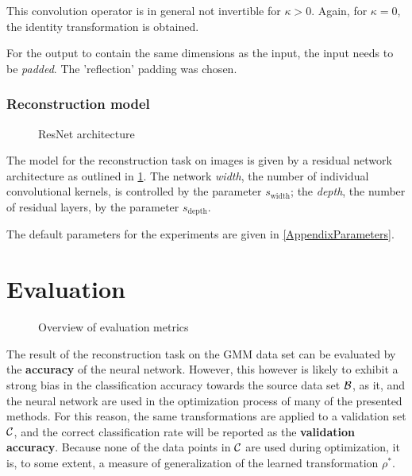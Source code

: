 This convolution operator is in general not invertible for $\kappa > 0$.
Again, for $\kappa = 0$, the identity transformation is obtained.

For the output to contain the same dimensions as the input, the input needs to be \textit{padded}.
The 'reflection' padding was chosen.


\subsubsection{Reconstruction model}

\begin{figure}[!ht]
\begin{minipage}{0.5\textwidth}
\centering

\end{minipage}
\begin{minipage}{0.5\textwidth}
\centering

\end{minipage}
\caption{ResNet architecture}
\label{fig:resnet}
\end{figure}

The model for the reconstruction task on images is given by a residual network architecture
as outlined in \cref{fig:resnet}. 
The network \textit{width}, the number of individual convolutional kernels, is controlled by the parameter $s_\text{width}$; the \textit{depth}, the number of residual layers, by the parameter
$s_\text{depth}$.

The default parameters for the experiments are given in \cref{AppendixParameters}.




\section{Evaluation}
\label{sec:evaluation}

\begin{figure}[ht]
    \centering
    
    \caption{Overview of evaluation metrics}
    \label{fig:evaluation_overview}
    \centering
\end{figure}

The result of the reconstruction task on the GMM data set can be evaluated by the \textbf{accuracy}
of the neural network. However, this however is likely to exhibit a strong bias in the classification accuracy 
towards the source data set $\mathcal B$, as it, and 
the neural network 
are used in the optimization process
of many of the presented methods.
For this reason, the same transformations are applied to
a validation set $\mathcal C$, and the 
correct classification rate will be reported as the \textbf{validation accuracy}. 
Because none of the data points in $\mathcal C$
are used during optimization, it is, to some extent, a measure of generalization
of the learned transformation $\rho^*$.

